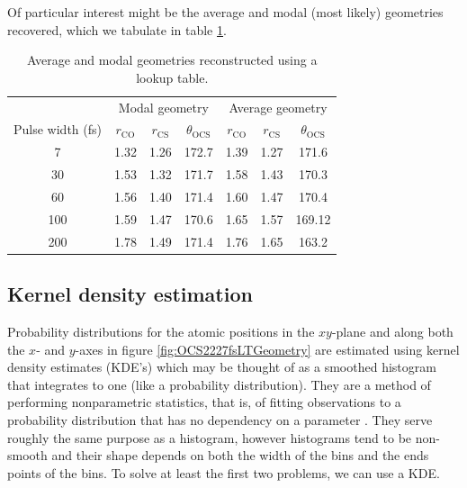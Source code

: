 Of particular interest might be the average and modal (most likely) geometries recovered, which we tabulate in table \ref{table:lookupTableGeometries}.

\begin{table}
  \myfloatalign
  \centering
  \begin{tabularx}{0.9\textwidth}{ccccccc}
    \toprule
    & \multicolumn{3}{c}{Modal geometry} & \multicolumn{3}{c}{Average geometry} \\
    Pulse width (fs) & $r_\mathrm{CO}$ & $r_\mathrm{CS}$ & $\theta_\mathrm{OCS}$ & $r_\mathrm{CO}$ & $r_\mathrm{CS}$ & $\theta_\mathrm{OCS}$ \\
    \midrule
    7 & 1.32 & 1.26 & 172.7 & 1.39 & 1.27 & 171.6 \\
    30 & 1.53 & 1.32 & 171.7 & 1.58 & 1.43 & 170.3 \\
    60 & 1.56 & 1.40 & 171.4 & 1.60 & 1.47 & 170.4 \\
    100 & 1.59 & 1.47 & 170.6 & 1.65 & 1.57 & 169.12 \\
    200 & 1.78 & 1.49 & 171.4 & 1.76 & 1.65 & 163.2 \\
    \bottomrule
  \end{tabularx}
  \caption[Average and modal geometries reconstructed using a lookup table.]
  {Average and modal geometries reconstructed using a lookup table.}
  \label{table:lookupTableGeometries}
\end{table}

\subsection{Kernel density estimation}
Probability distributions for the atomic positions in the $xy$-plane and along both the $x$- and $y$-axes in figure \ref{fig:OCS2227fsLTGeometry} are estimated using kernel density estimates (KDE's) which may be thought of as a smoothed histogram that integrates to one (like a probability distribution). They are a method of performing nonparametric statistics, that is, of fitting observations to a probability distribution that has no dependency on a parameter \citep[\S 20.2-20.3]{Kendall99}. They serve roughly the same purpose as a histogram, however histograms tend to be non-smooth and their shape depends on both the width of the bins and the ends points of the bins. To solve at least the first two problems, we can use a KDE.


